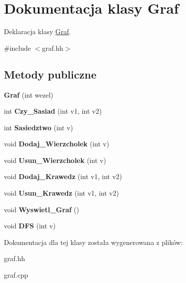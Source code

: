 \hypertarget{class_graf}{\section{\-Dokumentacja klasy \-Graf}
\label{class_graf}
}


\-Deklaracja klasy \hyperlink{class_graf}{\-Graf}.  




{\ttfamily \#include $<$graf.\-hh$>$}

\subsection*{\-Metody publiczne}
\begin{DoxyCompactItemize}
\item 
\hypertarget{class_graf_a4809653f3bc65a77b29a0a25bf18d519}{{\bfseries \-Graf} (int wezel)}\label{class_graf_a4809653f3bc65a77b29a0a25bf18d519}

\item 
\hypertarget{class_graf_aed19c3f131d93d626fa531ef0c741ca0}{int {\bfseries \-Czy\-\_\-\-Sasiad} (int v1, int v2)}\label{class_graf_aed19c3f131d93d626fa531ef0c741ca0}

\item 
\hypertarget{class_graf_a32a73f0f791aed133b4de2350faa6ff1}{int {\bfseries \-Sasiedztwo} (int v)}\label{class_graf_a32a73f0f791aed133b4de2350faa6ff1}

\item 
\hypertarget{class_graf_a175e4896f8088e647bb6146a974ec344}{void {\bfseries \-Dodaj\-\_\-\-Wierzcholek} (int v)}\label{class_graf_a175e4896f8088e647bb6146a974ec344}

\item 
\hypertarget{class_graf_a2f0eea39cc667502ac52c23945af9391}{void {\bfseries \-Usun\-\_\-\-Wierzcholek} (int v)}\label{class_graf_a2f0eea39cc667502ac52c23945af9391}

\item 
\hypertarget{class_graf_adb56e6b6e3286b32988ec5aca590433f}{void {\bfseries \-Dodaj\-\_\-\-Krawedz} (int v1, int v2)}\label{class_graf_adb56e6b6e3286b32988ec5aca590433f}

\item 
\hypertarget{class_graf_a6e8d0fac6774225ab6f51b5ecfd1cda3}{void {\bfseries \-Usun\-\_\-\-Krawedz} (int v1, int v2)}\label{class_graf_a6e8d0fac6774225ab6f51b5ecfd1cda3}

\item 
\hypertarget{class_graf_ae279a6a2704442982a6f4bc4db5a28ea}{void {\bfseries \-Wyswietl\-\_\-\-Graf} ()}\label{class_graf_ae279a6a2704442982a6f4bc4db5a28ea}

\item 
\hypertarget{class_graf_a65f85f47394575c1623e6def0445ab2f}{void {\bfseries \-D\-F\-S} (int v)}\label{class_graf_a65f85f47394575c1623e6def0445ab2f}

\end{DoxyCompactItemize}


\-Dokumentacja dla tej klasy została wygenerowana z plików\-:\begin{DoxyCompactItemize}
\item 
graf.\-hh\item 
graf.\-cpp\end{DoxyCompactItemize}
